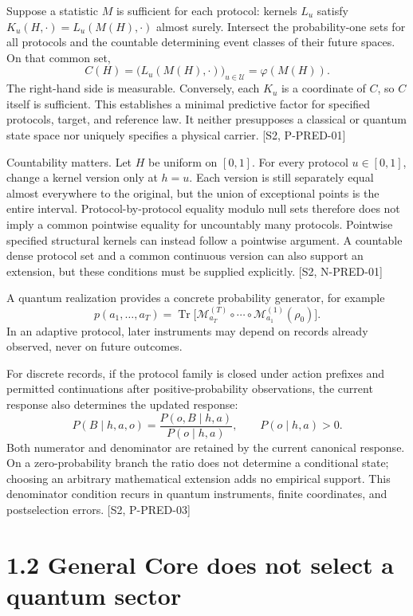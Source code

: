 \documentclass[
  11pt,
  oneside]{book}
\begin{document}
Suppose a statistic \(M\) is sufficient for each protocol: kernels
\(L_u\) satisfy \(K_u(H,\cdot)=L_u(M(H),\cdot)\) almost surely.
Intersect the probability-one sets for all protocols and the countable
determining event classes of their future spaces. On that common set, \[
C(H)=\bigl(L_u(M(H),\cdot)\bigr)_{u\in\mathcal U}=\varphi(M(H)).
\] The right-hand side is measurable. Conversely, each \(K_u\) is a
coordinate of \(C\), so \(C\) itself is sufficient. This establishes a
minimal predictive factor for specified protocols, target, and reference
law. It neither presupposes a classical or quantum state space nor
uniquely specifies a physical carrier. {[}S2, P-PRED-01{]}

Countability matters. Let \(H\) be uniform on \([0,1]\). For every
protocol \(u\in[0,1]\), change a kernel version only at \(h=u\). Each
version is still separately equal almost everywhere to the original, but
the union of exceptional points is the entire interval.
Protocol-by-protocol equality modulo null sets therefore does not imply
a common pointwise equality for uncountably many protocols. Pointwise
specified structural kernels can instead follow a pointwise argument. A
countable dense protocol set and a common continuous version can also
support an extension, but these conditions must be supplied explicitly.
{[}S2, N-PRED-01{]}

A quantum realization provides a concrete probability generator, for
example \[
p(a_1,\ldots,a_T)=
\operatorname{Tr}\bigl[
\mathcal M_{a_T}^{(T)}\circ\cdots\circ
\mathcal M_{a_1}^{(1)}(\rho_0)\bigr].
\] In an adaptive protocol, later instruments may depend on records
already observed, never on future outcomes.

For discrete records, if the protocol family is closed under action
prefixes and permitted continuations after positive-probability
observations, the current response also determines the updated response:
\[
P(B\mid h,a,o)=\frac{P(o,B\mid h,a)}{P(o\mid h,a)},\qquad P(o\mid h,a)>0.
\] Both numerator and denominator are retained by the current canonical
response. On a zero-probability branch the ratio does not determine a
conditional state; choosing an arbitrary mathematical extension adds no
empirical support. This denominator condition recurs in quantum
instruments, finite coordinates, and postselection errors. {[}S2,
P-PRED-03{]}

\section{1.2 General Core does not select a quantum sector}
\end{document}
